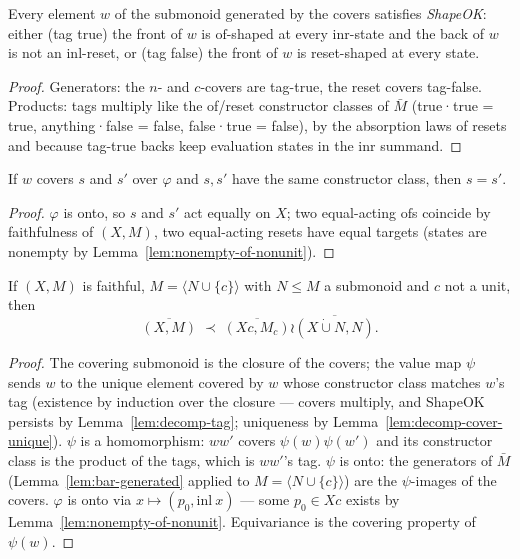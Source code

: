 \begin{lemma}\label{lem:decomp-tag}
  \leanok
  Every element $w$ of the submonoid generated by the covers satisfies
  \emph{ShapeOK}: either (tag true) the front of $w$ is
  $\mathrm{of}$-shaped at every $\mathrm{inr}$-state and the back of
  $w$ is not an $\mathrm{inl}$-reset, or (tag false) the front of $w$
  is reset-shaped at every state.
\end{lemma}
\begin{proof}
  \leanok
  Generators: the $n$- and $c$-covers are tag-true, the reset covers
  tag-false. Products: tags multiply like the of/reset constructor
  classes of $\bar M$ (true·true = true, anything·false = false,
  false·true = false), by the absorption laws of resets and because
  tag-true backs keep evaluation states in the $\mathrm{inr}$ summand.
\end{proof}

\begin{lemma}\label{lem:decomp-cover-unique}
  \leanok
  If $w$ covers $s$ and $s'$ over $\varphi$ and $s, s'$ have the same
  constructor class, then $s = s'$.
\end{lemma}
\begin{proof}
  \leanok
  $\varphi$ is onto, so $s$ and $s'$ act equally on $X$; two
  equal-acting $\mathrm{of}$s coincide by faithfulness of $(X,M)$, two
  equal-acting resets have equal targets (states are nonempty by
  Lemma~\ref{lem:nonempty-of-nonunit}).
\end{proof}

\begin{theorem}[{[DKS] Theorem 3.1}]\label{thm:decomposition}
  \leanok
  If $(X, M)$ is faithful, $M = \langle N \cup \{c\}\rangle$ with
  $N \le M$ a submonoid and $c$ not a unit, then
  \[
  \overline{(X,M)} \;\prec\;
  \overline{(Xc, M_c)} \wr \overline{(X \mathbin{\dot\cup} N, N)}.
  \]
\end{theorem}
\begin{proof}
  \leanok
  The covering submonoid is the closure of the covers; the value map
  $\psi$ sends $w$ to the unique element covered by $w$ whose constructor class
  matches $w$'s tag (existence by induction over the closure — covers
  multiply, and ShapeOK persists by Lemma~\ref{lem:decomp-tag};
  uniqueness by Lemma~\ref{lem:decomp-cover-unique}). $\psi$ is a
  homomorphism: $ww'$ covers $\psi(w)\psi(w')$ and its constructor
  class is the product of the tags, which is $ww'$'s tag. $\psi$ is
  onto: the generators of $\bar M$ (Lemma~\ref{lem:bar-generated}
  applied to $M = \langle N \cup \{c\}\rangle$) are the $\psi$-images of
  the covers. $\varphi$ is onto via
  $x \mapsto (p_0, \mathrm{inl}\ x)$ — some $p_0 \in Xc$ exists by
  Lemma~\ref{lem:nonempty-of-nonunit}. Equivariance is the covering
  property of $\psi(w)$.
\end{proof}
